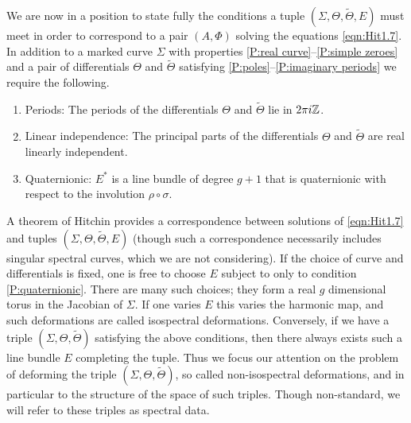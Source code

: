\documentclass{article}
\begin{document}

We are now in a position to state fully the conditions a tuple $(\Sigma,\Theta,\tilde{\Theta},E)$ must meet in order to correspond to a pair $(A,\Phi)$ solving the equations \eqref{eqn:Hit1.7}. In addition to a marked curve $\Sigma$ with properties \ref{P:real curve}--\ref{P:simple zeroes} and a pair of differentials $\Theta$ and $\tilde{\Theta}$ satisfying \ref{P:poles}--\ref{P:imaginary periods} we require the following.
\begin{enumerate}[resume*]
\item\label{P:periods} Periods: The periods of the differentials $\Theta$ and $\tilde{\Theta}$ lie in $2\pi i\mathbb{Z}$.
\item\label{P:linear independence} Linear independence: The principal parts of the differentials $\Theta$ and $\tilde{\Theta}$ are real linearly independent.
\item\label{P:quaternionic} Quaternionic: $E^*$ is a line bundle of degree $g+1$ that is quaternionic with respect to the involution $\rho\circ \sigma$.
\end{enumerate}

A theorem of Hitchin \cite[Theorem~8.1]{Hitchin1990} provides a correspondence between solutions of \eqref{eqn:Hit1.7} and tuples $(\Sigma,\Theta,\tilde{\Theta},E)$ (though such a correspondence necessarily includes singular spectral curves, which we are not considering). If the choice of curve and differentials is fixed, one is free to choose $E$ subject to only to condition \ref{P:quaternionic}. There are many such choices; they form a real $g$ dimensional torus in the Jacobian of $\Sigma$. If one varies $E$ this varies the harmonic map, and such deformations are called isospectral deformations. Conversely, if we have a triple $(\Sigma,\Theta,\tilde{\Theta})$ satisfying the above conditions, then there always exists such a line bundle $E$ completing the tuple. Thus we focus our attention on the problem of deforming the triple $(\Sigma,\Theta,\tilde{\Theta})$, so called non-isospectral deformations, and in particular to the structure of the space of such triples. Though non-standard, we will refer to these triples as spectral data.

\end{document}
